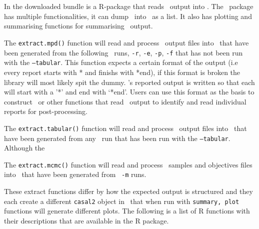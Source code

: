 \section{ \label{sec:post-processing}}

In the downloaded bundle is a R-package that reads \CNAME\ output into \R. The \CNAME\ package has multiple functionalities, it can dump \CNAME\ into \R\ as a list. It also has plotting and summarising functions for summarising \CNAME\ output.

The \texttt{extract.mpd()} function will read and process \CNAME\ output files into \R\ that have been generated from the following \CNAME\ runs, \texttt{-r}, \texttt{-e}, \texttt{-p}, \texttt{-f} that has not been run with the \texttt{--tabular}. This function expects a certain format of the output (i.e every report starts with * and finishs with *end), if this format is broken the library will most likely spit the dummy. \CNAME's reported output is written so that each  will start with a '*' and end with `*end'. Users can use this format as the basis to construct \R\ or other functions that read \CNAME\ output to identify and read individual reports for post-processing.

The \texttt{extract.tabular()} function will read and process \CNAME\ output files into \R\ that have been generated from any \CNAME\ run that has been run with the \texttt{--tabular}. Although the 

The \texttt{extract.mcmc()} function will read and process \CNAME\ samples and objectives files into \R\ that have been generated from \CNAME\ \texttt{-m} runs.

These extract functions differ by how the expected output is structured and they each create a different \texttt{casal2} object in \R\ that when run with \texttt{summary, plot} functions will generate different plots. The following is a list of R functions with their descriptions that are available in the R package.

